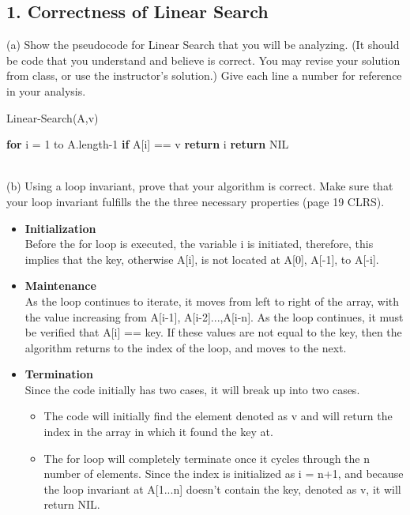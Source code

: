 \documentclass[12pt]{article}
\begin{document}
\subsection*{1. Correctness of Linear Search}
(a) Show the pseudocode for Linear Search that you will be analyzing. (It should be code that you understand and believe is correct. You may revise your solution from class, or use the instructor's solution.) Give each line a number for reference in your analysis.  \\
\begin{algorithm}
\caption{Linear-Search(A,v)}
\begin{algorithmic}[1]
\State \textbf{for} i = 1 to A.length-1
\State \qquad \textbf{if} A[i] == v
\State \qquad \qquad \textbf{return} i
\State \textbf{return} NIL
\end{algorithmic}
\end{algorithm}
\\
(b) Using a loop invariant, prove that your algorithm is correct. Make sure that your loop invariant fulfills the the three necessary properties (page 19 CLRS). \\
\begin{itemize}
    \item \textbf{Initialization} \\
    Before the for loop is executed,  the variable i is initiated,  therefore, this implies that the key, otherwise A[i], is not located at A[0], A[-1], to A[-i]. 
    \item \textbf{Maintenance} \\
    As the loop continues to iterate, it moves from left to right of the array, with the value increasing from A[i-1], A[i-2]...,A[i-n]. As the loop continues, it must be verified that A[i] == key.  If these values are not equal to the key,  then the algorithm returns to the index of the loop, and moves to the next. 
    \item \textbf{Termination} \\
    Since the code initially has two cases, it will break up into two cases. 
    \begin{itemize}
        \item The code will initially find the element denoted as v and will return the index in the array in which it found the key at. 
        \item The for loop will completely terminate once it cycles through the n number of elements. Since the index is initialized as i = n+1, and because the loop invariant at A[1...n] doesn't contain the key, denoted as v, it will return NIL.
    \end{itemize}
\end{itemize}
\clearpage
\end{document}
